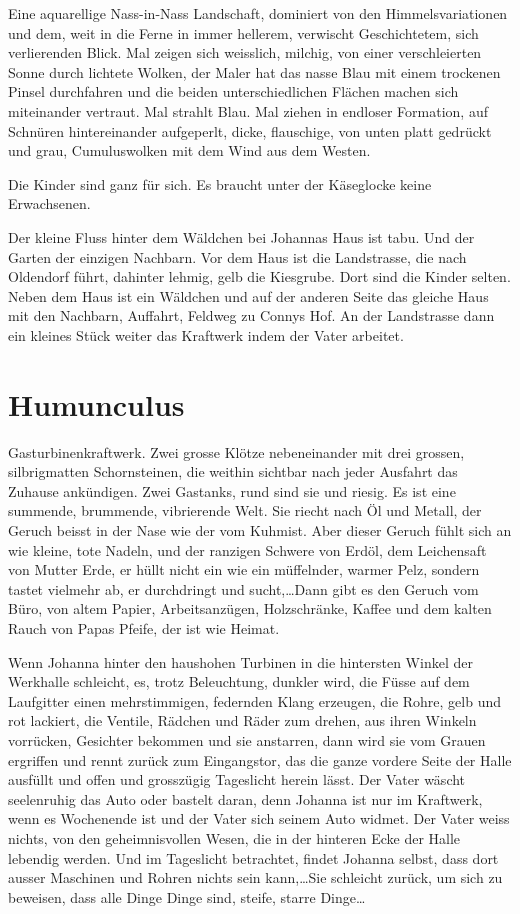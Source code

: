 \documentclass[10pt,a5paper]{book}
\begin{document}
Eine aquarellige Nass-in-Nass Landschaft, dominiert von den Himmelsvariationen und dem, weit in die Ferne in immer hellerem, verwischt Geschichtetem, sich verlierenden Blick. Mal zeigen sich weisslich, milchig, von einer verschleierten Sonne durch lichtete Wolken, der Maler hat das nasse Blau mit einem trockenen Pinsel durchfahren und die beiden unterschiedlichen Flächen machen sich miteinander vertraut. Mal strahlt Blau. Mal ziehen in endloser Formation, auf Schnüren hintereinander aufgeperlt, dicke, flauschige,  von unten platt gedrückt und grau, Cumuluswolken mit dem Wind aus dem Westen.

Die Kinder sind ganz für sich. Es braucht unter der Käseglocke keine Erwachsenen. 

Der kleine Fluss hinter dem Wäldchen bei Johannas Haus ist tabu. Und der Garten der einzigen Nachbarn. Vor dem Haus ist die Landstrasse, die nach Oldendorf führt, dahinter lehmig, gelb die Kiesgrube. Dort sind die Kinder selten. Neben dem Haus ist ein Wäldchen und auf der anderen Seite das gleiche Haus mit den Nachbarn, Auffahrt, Feldweg zu Connys Hof. An der Landstrasse dann ein kleines Stück weiter das Kraftwerk indem der Vater arbeitet.



\section*{Humunculus}



Gasturbinenkraftwerk. Zwei grosse Klötze nebeneinander mit drei grossen, silbrigmatten Schornsteinen, die weithin sichtbar nach jeder Ausfahrt das Zuhause ankündigen. Zwei Gastanks, rund sind sie und riesig. Es ist eine summende, brummende, vibrierende Welt. Sie riecht nach Öl und Metall, der Geruch beisst in der Nase wie der vom Kuhmist. Aber dieser Geruch fühlt sich an wie kleine, tote Nadeln, und der ranzigen Schwere von Erdöl, dem Leichensaft von Mutter Erde, er hüllt nicht ein wie ein müffelnder, warmer Pelz, sondern tastet vielmehr ab, er durchdringt und sucht,\dots Dann gibt es den Geruch vom Büro, von altem Papier, Arbeitsanzügen, Holzschränke, Kaffee und dem kalten Rauch von Papas Pfeife, der ist wie Heimat.

Wenn Johanna hinter den haushohen Turbinen in die hintersten Winkel der Werkhalle schleicht, es, trotz Beleuchtung, dunkler wird, die Füsse auf dem Laufgitter einen mehrstimmigen, federnden Klang erzeugen, die Rohre, gelb und rot lackiert, die Ventile, Rädchen und Räder zum drehen, aus ihren Winkeln vorrücken, Gesichter bekommen und sie anstarren, dann wird sie vom Grauen ergriffen und rennt zurück zum Eingangstor, das die ganze vordere Seite der Halle ausfüllt und offen und grosszügig Tageslicht herein lässt. Der Vater wäscht seelenruhig das Auto oder bastelt daran, denn Johanna ist nur im Kraftwerk, wenn es Wochenende ist und der Vater sich seinem Auto widmet. Der Vater weiss nichts, von den geheimnisvollen Wesen, die in  der hinteren Ecke der Halle lebendig werden. Und im Tageslicht betrachtet, findet Johanna selbst, dass dort ausser Maschinen und Rohren nichts sein kann,\dots Sie schleicht zurück, um sich zu beweisen, dass alle Dinge Dinge sind, steife, starre Dinge\dots
\end{document}
